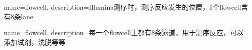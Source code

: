 {
  name=flowcell,
  description={Illumina测序时，测序反应发生的位置，1个flowcell含有8条lane}
}

{
	name=flowcell,
	description={每一个flowcell上都有8条泳道，用于测序反应，可以添加试剂，洗脱等等}
}
